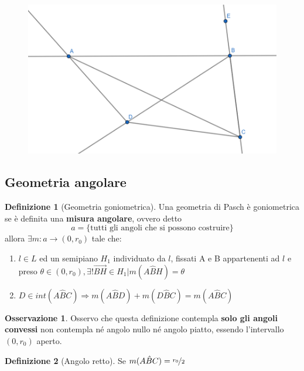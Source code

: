 \documentclass[a4paper,10pt]{article}
\theoremstyle{definition}
\theoremstyle{indentdefinition}
\newtheorem{defn}{Definizione}[section]
\theoremstyle{indentpostulate}
\theoremstyle{indenttheorem}
\theoremstyle{myremark}
\newtheorem*{rem*}{Osservazione}
\theoremstyle{indentgeneral}
\begin{document}
 \begin{figure}[H]
     \centering
     \includegraphics[scale=0.3]{Lemma1.png}
 \end{figure}

 \vspace{.5cm}

\subsection{Geometria angolare}
\begin{defn}[Geometria goniometrica]    Una geometria di Pasch è goniometrica se è definita una \textbf{misura angolare}, ovvero detto $$a=\{\text{tutti gli angoli che si possono costruire}\}$$ allora $\exists m:a\rightarrow (0,r_0)$ tale che:
\begin{enumerate}
    \item $l \in L$ ed un semipiano $H_1$ individuato da $l$, fissati A e B appartenenti ad $l$ e preso $\theta \in (0,r_0), \exists ! \overrightarrow{BH} \in H_1| m(A\hat{B} H)=\theta$
    \item $D \in int(A\hat{B}C) \Rightarrow m(A\hat{B}D)+m(D\hat{B}C)=m(A\hat{B}C)$
\end{enumerate}
\end{defn} 

\begin{rem*}
    Osservo che questa definizione contempla \textbf{solo gli angoli convessi} non contempla né angolo nullo né angolo piatto, essendo l'intervallo $(0,r_0)$ aperto.
\end{rem*}

\begin{defn}[Angolo retto]  Se $m(A\hat{B}C)=\nicefrac{r_0}{2}$  \end{defn} 
\end{document}

